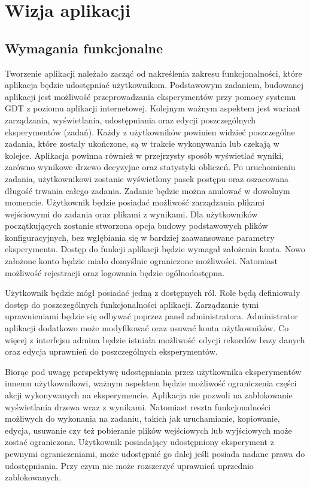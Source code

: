 \chapter{Wizja aplikacji}

\section{Wymagania funkcjonalne}
Tworzenie aplikacji należało zacząć od nakreślenia zakresu funkcjonalności, które aplikacja będzie udostępniać użytkownikom. Podstawowym zadaniem, budowanej aplikacji jest możliwość przeprowadzania eksperymentów przy pomocy systemu GDT z poziomu aplikacji internetowej. Kolejnym ważnym aspektem jest wariant zarządzania, wyświetlania, udostępniania oraz edycji poszczególnych eksperymentów (zadań). Każdy z użytkowników powinien widzieć poszczególne zadania, które zostały ukończone, są w trakcie wykonywania lub czekają w kolejce. Aplikacja powinna również w przejrzysty sposób wyświetlać wyniki, zarówno wynikowe drzewo decyzyjne oraz statystyki obliczeń. Po uruchomieniu zadania, użytkownikowi zostanie wyświetlony pasek postępu oraz oszacowana długość trwania całego zadania. Zadanie będzie można anulować w dowolnym momencie.  Użytkownik będzie posiadać możliwość zarządzania plikami wejściowymi do zadania oraz plikami z wynikami. Dla użytkowników początkujących zostanie stworzona opcja budowy podstawowych plików konfiguracyjnych, bez wgłębiania się w bardziej zaawansowane parametry eksperymentu. Dostęp do funkcji aplikacji będzie wymagał założenia konta. Nowo założone konto będzie miało domyślnie ograniczone możliwości. Natomiast możliwość rejestracji oraz logowania będzie ogólnodostępna.

Użytkownik będzie mógł posiadać jedną z dostępnych ról. Role będą definiowały dostęp do poszczególnych funkcjonalności aplikacji. Zarządzanie tymi uprawnieniami będzie się odbywać poprzez panel administratora. Administrator aplikacji dodatkowo może modyfikować oraz usuwać konta użytkowników. Co więcej z interfejsu admina będzie istniała możliwość edycji rekordów bazy danych oraz edycja uprawnień do poszczególnych eksperymentów. 

Biorąc pod uwagę perspektywę udostępniania przez użytkownika eksperymentów innemu użytkownikowi, ważnym aspektem będzie możliwość ograniczenia części akcji wykonywanych na eksperymencie. Aplikacja nie pozwoli na zablokowanie wyświetlania drzewa wraz z wynikami. Natomiast reszta funkcjonalności możliwych do wykonania na zadaniu, takich jak uruchamianie, kopiowanie, edycja, usuwanie czy też pobieranie plików wejściowych lub wyjściowych może zostać ograniczona. Użytkownik posiadający udostępniony eksperyment z pewnymi ograniczeniami, może udostępnić go dalej jeśli posiada nadane prawa do udostępniania. Przy czym nie może rozszerzyć uprawnień uprzednio zablokowanych.



